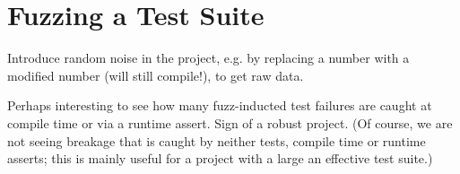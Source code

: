 \documentclass[12pt]{article}
\begin{document}
\section{Fuzzing a Test Suite}

Introduce random noise in the project, e.g. by replacing a number with a modified number (will still compile!), to get raw data.

Perhaps interesting to see how many fuzz-inducted test failures are caught at compile time or via a runtime assert. Sign of a robust project. (Of course, we are not seeing breakage that is caught by neither tests, compile time or runtime asserts; this is mainly useful for a project with a large an effective test suite.)


%
%
\end{document}
